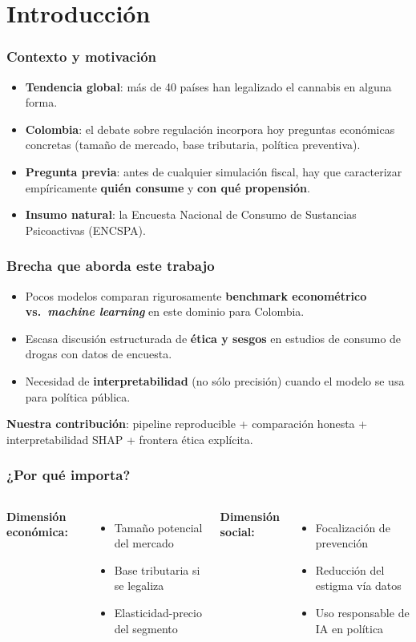 \section{Introducción}

\begin{frame}
\frametitle{Contexto y motivación}
\begin{itemize}
    \item \textbf{Tendencia global}: más de 40 países han legalizado el cannabis en alguna forma.
    \item \textbf{Colombia}: el debate sobre regulación incorpora hoy preguntas económicas concretas (tamaño de mercado, base tributaria, política preventiva).
    \item \textbf{Pregunta previa}: antes de cualquier simulación fiscal, hay que caracterizar empíricamente \textbf{quién consume} y \textbf{con qué propensión}.
    \item \textbf{Insumo natural}: la Encuesta Nacional de Consumo de Sustancias Psicoactivas (ENCSPA).
\end{itemize}
\end{frame}

\begin{frame}
\frametitle{Brecha que aborda este trabajo}
\begin{itemize}
    \item Pocos modelos comparan rigurosamente \textbf{benchmark econométrico vs.\ \textit{machine learning}} en este dominio para Colombia.
    \item Escasa discusión estructurada de \textbf{ética y sesgos} en estudios de consumo de drogas con datos de encuesta.
    \item Necesidad de \textbf{interpretabilidad} (no sólo precisión) cuando el modelo se usa para política pública.
\end{itemize}
\vspace{0.3cm}
\textbf{Nuestra contribución}: pipeline reproducible + comparación honesta + interpretabilidad SHAP + frontera ética explícita.
\end{frame}

\begin{frame}
\frametitle{¿Por qué importa?}
\begin{columns}
\textbf{Dimensión económica:}
\begin{itemize}
    \item Tamaño potencial del mercado
    \item Base tributaria si se legaliza
    \item Elasticidad-precio del segmento
\end{itemize}

\textbf{Dimensión social:}
\begin{itemize}
    \item Focalización de prevención
    \item Reducción del estigma vía datos
    \item Uso responsable de IA en política
\end{itemize}
\end{columns}
\end{frame}
